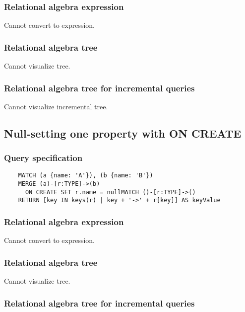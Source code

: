 	\subsubsection*{Relational algebra expression}

	Cannot convert to expression.

	\subsubsection*{Relational algebra tree}

	Cannot visualize tree.

	\subsubsection*{Relational algebra tree for incremental queries}

	Cannot visualize incremental tree.
	\subsection{Null-setting one property with ON CREATE}

	\subsubsection*{Query specification}

	\begin{lstlisting}
	MATCH (a {name: 'A'}), (b {name: 'B'})
	MERGE (a)-[r:TYPE]->(b)
	  ON CREATE SET r.name = nullMATCH ()-[r:TYPE]->()
	RETURN [key IN keys(r) | key + '->' + r[key]] AS keyValue
	\end{lstlisting}


	\subsubsection*{Relational algebra expression}

	Cannot convert to expression.

	\subsubsection*{Relational algebra tree}

	Cannot visualize tree.

	\subsubsection*{Relational algebra tree for incremental queries}

